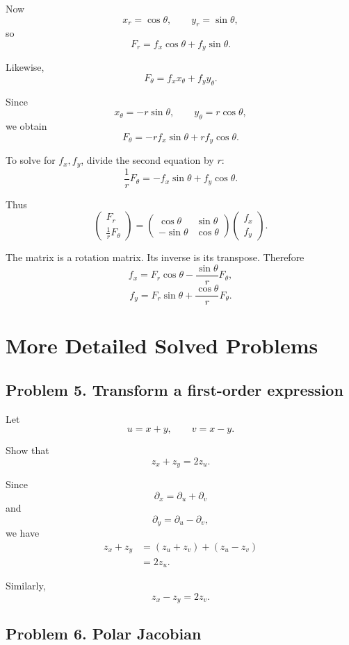 \documentclass[11pt,oneside]{book}
\theoremstyle{studentthm}
\theoremstyle{definition}
\begin{document}
Now
\[
x_r=\cos\theta,
\qquad
y_r=\sin\theta,
\]
so
\[
F_r
=
f_x\cos\theta+f_y\sin\theta.
\]

Likewise,
\[
F_\theta
=
f_xx_\theta+f_yy_\theta.
\]

Since
\[
x_\theta=-r\sin\theta,
\qquad
y_\theta=r\cos\theta,
\]
we obtain
\[
F_\theta
=
-rf_x\sin\theta
+
rf_y\cos\theta.
\]

To solve for \(f_x,f_y\), divide the second equation by \(r\):
\[
\frac1rF_\theta
=
-f_x\sin\theta
+
f_y\cos\theta.
\]

Thus
\[
\begin{pmatrix}
F_r\\
\frac1rF_\theta
\end{pmatrix}
=
\begin{pmatrix}
\cos\theta&\sin\theta\\
-\sin\theta&\cos\theta
\end{pmatrix}
\begin{pmatrix}
f_x\\
f_y
\end{pmatrix}.
\]

The matrix is a rotation matrix. Its inverse is its transpose.
Therefore
\[
f_x
=
F_r\cos\theta
-
\frac{\sin\theta}{r}F_\theta,
\]
\[
f_y
=
F_r\sin\theta
+
\frac{\cos\theta}{r}F_\theta.
\]

\section{More Detailed Solved Problems}

\subsection*{Problem 5. Transform a first-order expression}

Let
\[
u=x+y,\qquad v=x-y.
\]

Show that
\[
z_x+z_y=2z_u.
\]

Since
\[
\partial_x=\partial_u+\partial_v
\]
and
\[
\partial_y=\partial_u-\partial_v,
\]
we have
\[
\begin{aligned}
z_x+z_y
&=
(z_u+z_v)+(z_u-z_v)\\
&=
2z_u.
\end{aligned}
\]

Similarly,
\[
z_x-z_y=2z_v.
\]

\subsection*{Problem 6. Polar Jacobian}
\end{document}
